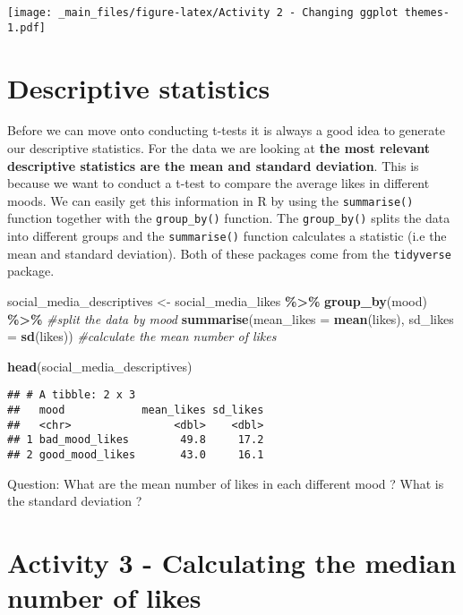 \documentclass[
]{book}
\newenvironment{Shaded}{\begin{snugshade}}{\end{snugshade}}
\newcommand{\AttributeTok}[1]{\textcolor[rgb]{0.13,0.29,0.53}{#1}}
\newcommand{\CommentTok}[1]{\textcolor[rgb]{0.56,0.35,0.01}{\textit{#1}}}
\newcommand{\FunctionTok}[1]{\textcolor[rgb]{0.13,0.29,0.53}{\textbf{#1}}}
\newcommand{\NormalTok}[1]{#1}
\newcommand{\OtherTok}[1]{\textcolor[rgb]{0.56,0.35,0.01}{#1}}
\newcommand{\SpecialCharTok}[1]{\textcolor[rgb]{0.81,0.36,0.00}{\textbf{#1}}}
\begin{document}
\texttt{[image: \_main\_files/figure-latex/Activity 2 - Changing ggplot themes-1.pdf]}

\section{Descriptive statistics}\label{descriptive-statistics}

Before we can move onto conducting t-tests it is always a good idea to generate our descriptive statistics. For the data we are looking at \textbf{the most relevant descriptive statistics are the mean and standard deviation}. This is because we want to conduct a t-test to compare the average likes in different moods. We can easily get this information in R by using the \texttt{summarise()} function together with the \texttt{group\_by()} function. The \texttt{group\_by()} splits the data into different groups and the \texttt{summarise()} function calculates a statistic (i.e the mean and standard deviation). Both of these packages come from the \texttt{tidyverse} package.

\begin{Shaded}
\begin{Highlighting}[]
\NormalTok{social\_media\_descriptives }\OtherTok{\textless{}{-}}\NormalTok{ social\_media\_likes }\SpecialCharTok{\%\textgreater{}\%} 
  \FunctionTok{group\_by}\NormalTok{(mood) }\SpecialCharTok{\%\textgreater{}\%} \CommentTok{\#split the data by mood}
  \FunctionTok{summarise}\NormalTok{(}\AttributeTok{mean\_likes =} \FunctionTok{mean}\NormalTok{(likes),}
            \AttributeTok{sd\_likes =} \FunctionTok{sd}\NormalTok{(likes)) }\CommentTok{\#calculate the mean number of likes}

\FunctionTok{head}\NormalTok{(social\_media\_descriptives)}
\end{Highlighting}
\end{Shaded}

\begin{verbatim}
## # A tibble: 2 x 3
##   mood            mean_likes sd_likes
##   <chr>                <dbl>    <dbl>
## 1 bad_mood_likes        49.8     17.2
## 2 good_mood_likes       43.0     16.1
\end{verbatim}

Question: What are the mean number of likes in each different mood ? What is the standard deviation ?

\section{Activity 3 - Calculating the median number of likes}\label{activity-3---calculating-the-median-number-of-likes}
\end{document}

